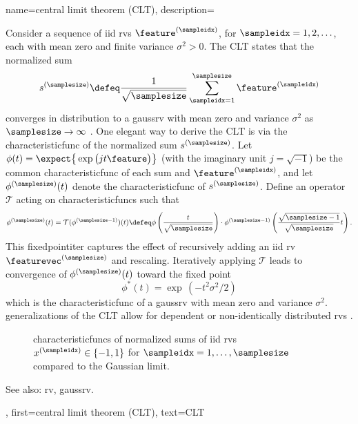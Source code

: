 {{    	
{name={central limit theorem (CLT)},
	description={Consider a sequence of \gls{iid} \glspl{rv} \( \feature^{(\sampleidx)} \), for \( \sampleidx = 1, 2, \ldots \), 
		each with \gls{mean} zero and finite \gls{variance} \( \sigma^2 > 0 \). 
		The  CLT states that the normalized sum 
		\[
		s^{(\samplesize)} \defeq \frac{1}{\sqrt{\samplesize}} \sum_{\sampleidx = 1}^{\samplesize} \feature^{(\sampleidx)} 
		\]
		converges in distribution to a \gls{gaussrv} with \gls{mean} zero and \gls{variance} \( \sigma^2 \) as \( \samplesize \to \infty \) \cite[Proposition~2.17]{AsympVanderVaartBook}.
		One elegant way to derive the CLT is via the \gls{characteristicfunc} of the normalized sum \( s^{(\samplesize)} \). 
		Let $ \phi(t) = \expect \big\{ \exp \big( j t \feature \big) \big\}$ (with the imaginary unit $j = \sqrt{-1}$) 
		be the common \gls{characteristicfunc} of each sum and $\feature^{(\sampleidx)}$, and let \( \phi^{(\samplesize)}(t) \) 
		denote the \gls{characteristicfunc} of \( s^{(\samplesize)} \). Define an operator \( \mathcal{T} \) acting on \glspl{characteristicfunc} 
		such that
		\[
		\phi^{(\samplesize)}(t) = \mathcal{T}(\phi^{(\samplesize-1)})(t) \defeq \phi\left( \frac{t}{\sqrt{\samplesize}} \right) \cdot \phi^{(\samplesize-1)}\left( \frac{\sqrt{\samplesize-1}}{\sqrt{\samplesize}} t \right).
		\]
		This \gls{fixedpointiter} captures the effect of recursively adding an \gls{iid} \gls{rv} $\featurevec^{(\samplesize)}$ 
		and rescaling. Iteratively applying \( \mathcal{T} \) leads to convergence of \( \phi^{(\samplesize)}(t) \) toward the fixed point
		\[
		\phi^*(t) = \exp\,(-t^2 \sigma^2 / 2)
		\]
		which is the \gls{characteristicfunc} of a \gls{gaussrv} with \gls{mean} zero and \gls{variance} 
		\( \sigma^2 \). \Glspl{generalization} of the CLT allow for dependent or non-identically distributed \glspl{rv} \cite[Sec.~2.8]{AsympVanderVaartBook}.
		\begin{figure}[H]
			\centering
			\caption{\Glspl{characteristicfunc} of normalized sums of \gls{iid} \glspl{rv} $x^{(\sampleidx)} \in \{-1,1\}$ 
			for $\sampleidx=1,\ldots,\samplesize$ compared to the Gaussian limit.}
		\end{figure}
		See also: \gls{rv}, \gls{gaussrv}.},
	first={central limit theorem (CLT)},
	text={CLT}
}

}}
